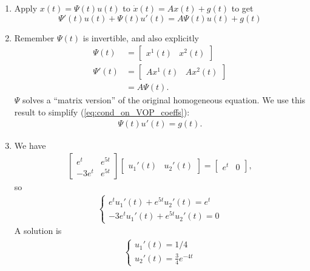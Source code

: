 \documentclass[11pt, letterpaper, oneside]{article}     %
\numberwithin{equation}{subsection}
\theoremstyle{definition}
\numberwithin{theorem}{section}
\theoremstyle{remark}
\begin{document}
\begin{enumerate}
\begin{enumerate}
  \item Apply $x(t) = \Psi(t)u(t)$ to $\dot x(t) = Ax(t) + g(t)$ to get
    \begin{equation}\label{eq:cond_on_VOP_coeffs}
      \Psi'(t)u(t) + \Psi(t)u'(t) = A\Psi(t)u(t) + g(t)
    \end{equation}

  \item Remember $\Psi(t)$ is invertible, and also explicitly
    \begin{align}
      \Psi(t) &=
      \begin{bmatrix}
        x^1(t) & x^2(t)
      \end{bmatrix}\\
      \Psi'(t) &=
      \begin{bmatrix}
        Ax^1(t) & Ax^2(t)
      \end{bmatrix}\\
      &= A\Psi(t).
    \end{align}
    $\Psi$ solves a ``matrix version'' of the original homogeneous equation. We use this result to simplify (\ref{eq:cond_on_VOP_coeffs}):
    \begin{align}
      \Psi(t)u'(t) = g(t).
    \end{align}

  \item We have
    \begin{align}
      \begin{bmatrix}
        e^t & e^{5t}\\
        -3e^t & e^{5t}
      \end{bmatrix}
      \begin{bmatrix}
        u_1'(t) & u_2'(t)
      \end{bmatrix}
      =
      \begin{bmatrix}
        e^t & 0
      \end{bmatrix},
    \end{align}
    so
    \begin{align}
      \begin{cases}
        e^tu_1'(t) + e^{5t}u_2'(t) = e^t\\
        -3e^tu_1'(t) + e^{5t}u_2'(t) = 0
      \end{cases}
    \end{align}
    A solution is
    \begin{align}
      \begin{cases}
        u_1'(t) = 1/4\\
        u_2'(t) = \frac{3}{4}e^{-4t}
      \end{cases}
    \end{align}


\end{enumerate}
\end{enumerate}
\end{document}
